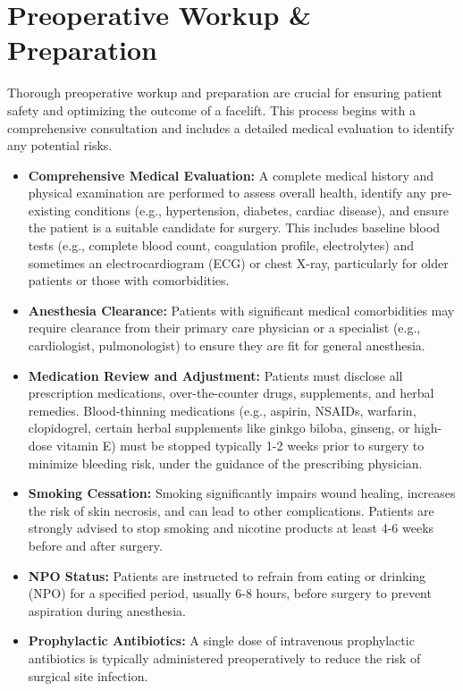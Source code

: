 \section*{Preoperative Workup \& Preparation}
Thorough preoperative workup and preparation are crucial for ensuring patient safety and optimizing the outcome of a facelift. This process begins with a comprehensive consultation and includes a detailed medical evaluation to identify any potential risks.

\begin{itemize}
  \item \textbf{Comprehensive Medical Evaluation:} A complete medical history and physical examination are performed to assess overall health, identify any pre-existing conditions (e.g., hypertension, diabetes, cardiac disease), and ensure the patient is a suitable candidate for surgery. This includes baseline blood tests (e.g., complete blood count, coagulation profile, electrolytes) and sometimes an electrocardiogram (ECG) or chest X-ray, particularly for older patients or those with comorbidities.
  \item \textbf{Anesthesia Clearance:} Patients with significant medical comorbidities may require clearance from their primary care physician or a specialist (e.g., cardiologist, pulmonologist) to ensure they are fit for general anesthesia.
  \item \textbf{Medication Review and Adjustment:} Patients must disclose all prescription medications, over-the-counter drugs, supplements, and herbal remedies. Blood-thinning medications (e.g., aspirin, NSAIDs, warfarin, clopidogrel, certain herbal supplements like ginkgo biloba, ginseng, or high-dose vitamin E) must be stopped typically 1-2 weeks prior to surgery to minimize bleeding risk, under the guidance of the prescribing physician.
  \item \textbf{Smoking Cessation:} Smoking significantly impairs wound healing, increases the risk of skin necrosis, and can lead to other complications. Patients are strongly advised to stop smoking and nicotine products at least 4-6 weeks before and after surgery.
  \item \textbf{NPO Status:} Patients are instructed to refrain from eating or drinking (NPO) for a specified period, usually 6-8 hours, before surgery to prevent aspiration during anesthesia.
  \item \textbf{Prophylactic Antibiotics:} A single dose of intravenous prophylactic antibiotics is typically administered preoperatively to reduce the risk of surgical site infection.

\end{itemize}

